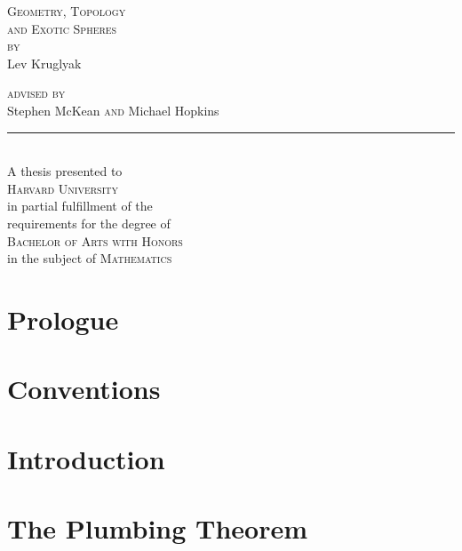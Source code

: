 \documentclass{lkx_thesis}
\begin{document}
\begin{titlepage}
	\begin{center}
		\vfill
		{\HUGE\scshape Geometry, Topology\\ and Exotic Spheres}\\[4em]

		{\Large \scshape by}\\[2em]
		{\huge Lev Kruglyak}\\[3in]

		{
		\Large
		{\scshape advised by\\[1em]}
		{Stephen McKean}
		{\scshape  and}
		{Michael Hopkins}\\[1em]
    \noindent\rule{1in}{0.6pt}\\[1em]
		A thesis presented to \\[1em]
		\textsc{Harvard University}\\[1em]
		in partial fulfillment of the \\
		requirements for the degree of\\[1em]

		\textsc{Bachelor of Arts with Honors}\\
		in the subject of \textsc{Mathematics}
		}
		\vfill
	\end{center}
\end{titlepage}

\lkxtoc

\chapter*{Prologue}\label{chap:prologue}


\chapter*{Conventions}\label{chap:conventions}


\chapter{Introduction}\label{chap:introduction}


\chapter{The Plumbing Theorem}\label{chap:construction}

\end{document}
